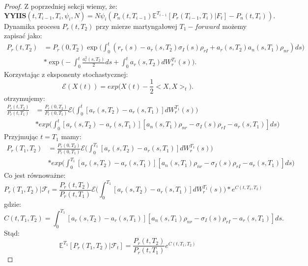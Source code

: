 \documentclass{mini}
\theoremstyle{mythstyle}
\begin{document}
	\begin{proof}
	Z poprzedniej sekcji wiemy, że:
	\begin{equation*}
	\textbf{YYIIS}(t,T_{i-1},T_i,\psi_i,N) = N\psi_i (P_n(t,T_{i-1})\mathbb{E}^{T_{i-1}}[P_r(T_{i-1},T_i)|F_t]-P_n(t,T_i)).
	\end{equation*}
	Dynamika procesu $P_r(t,T_2)$ przy mierze martyngałowej $T_1-forward$ możemy zapisać jako:
	\begin{align*}
	P_r(t, T_2) &= P_r(0, T_2) \exp \bigg( \int_{0}^{t} (r_r(s) - a_r(s, T_2) \sigma_I(s)\rho_{rI} + a_r(s, T_2)a_n(s, T_1)\rho_{nr}) ds \bigg) \\
	&* \exp \bigg(-\int_{0}^{t} \frac{a^2_r(s, T_2)}{2}ds + \int_{0}^{t} a_r(s, T_2)dW_r^{T_1}(s)\bigg).
	\end{align*}
	Korzystając z eksponenty stochastycznej:
	\begin{equation*}
		\mathcal{E} (X(t)) = exp \bigg(X(t) - \frac{1}{2}<X,X>_t\bigg).
	\end{equation*}
otrzymujemy:
	\begin{align*}
	\frac{P_r(t,T_2)}{P_r(t,T_1)} &= \frac{P_r(0,T_2)}{P_r(0,T_1)} \mathcal{E}  \bigg( \int_{0}^{t} [a_r(s,T_2) - a_r(s,T_1)]dW_r^{T_1}(s)\bigg)\\
	&*exp\bigg(\int_{0}^{t} [a_r(s,T_2) - a_r(s,T_1)][a_n(s,T_1)\rho_{nr} - \sigma_I(s)\rho_{rI} - a_r(s,T_1)]ds \bigg)
	\end{align*}
	Przyjmując $t = T_1$ mamy:
	\begin{align*}
	P_r(T_1,T_2) &= \frac{P_r(0,T_2)}{P_r(0,T_1)} \mathcal{E} \bigg( \int_{0}^{T_1} [a_r(s,T_2) - a_r(s,T_1)]dW_r^{T_1}(s)\bigg)\\
	&*exp\bigg(\int_{0}^{T_1} [a_r(s,T_2) - a_r(s,T_1)][a_n(s,T_1)\rho_{nr} - \sigma_I(s)\rho_{rI} - a_r(s,T_1)]ds \bigg)
	\end{align*}
	Co jest równoważne:
	\begin{equation*}
	P_r(T_1,T_2) | \mathcal{F}_t = \frac{P_r(t,T_2)}{P_r(t,T_1)} \mathcal{E}  \bigg( \int_{0}^{T_1} [a_r(s,T_2) - a_r(s,T_1)]dW_r^{T_1}(s)\bigg) * e^{C(t,T_1,T_2)}
	\end{equation*}
	gdzie:
	\begin{equation*}
	C(t,T_1,T_2) = \int_{0}^{T_1} [a_r(s,T_2) - a_r(s,T_1)][a_n(s,T_1)\rho_{nr} - \sigma_I(s)\rho_{rI} - a_r(s,T_1)]ds.
	\end{equation*}
	Stąd:
	\begin{equation*}
	\mathbb{E}^{T_1}[P_r(T_1,T_2) | \mathcal{F}_t] = \frac{P_r(t,T_2)}{P_r(t,T_1)} e^{C(t,T_1,T_2)}
	\end{equation*}

\end{proof}
\end{document}
